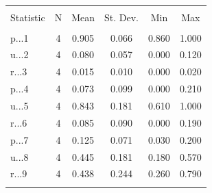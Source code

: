 
\begin{table}[!htbp] \centering 
  \caption{} 
  \label{} 
\begin{tabular}{@{\extracolsep{5pt}}lccccc} 
\\[-1.8ex]\hline 
\hline \\[-1.8ex] 
Statistic & \multicolumn{1}{c}{N} & \multicolumn{1}{c}{Mean} & \multicolumn{1}{c}{St. Dev.} & \multicolumn{1}{c}{Min} & \multicolumn{1}{c}{Max} \\ 
\hline \\[-1.8ex] 
p...1 & 4 & 0.905 & 0.066 & 0.860 & 1.000 \\ 
u...2 & 4 & 0.080 & 0.057 & 0.000 & 0.120 \\ 
r...3 & 4 & 0.015 & 0.010 & 0.000 & 0.020 \\ 
p...4 & 4 & 0.073 & 0.099 & 0.000 & 0.210 \\ 
u...5 & 4 & 0.843 & 0.181 & 0.610 & 1.000 \\ 
r...6 & 4 & 0.085 & 0.090 & 0.000 & 0.190 \\ 
p...7 & 4 & 0.125 & 0.071 & 0.030 & 0.200 \\ 
u...8 & 4 & 0.445 & 0.181 & 0.180 & 0.570 \\ 
r...9 & 4 & 0.438 & 0.244 & 0.260 & 0.790 \\ 
\hline \\[-1.8ex] 
\end{tabular} 
\end{table} 
